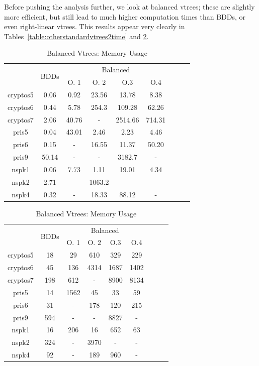 \documentclass[11pt]{report}
\begin{document}
Before pushing the analysis further, we look at balanced vtrees; these are slightly more efficient, but still lead to much higher computation times than BDDs, or even right-linear vtrees. This results appear very clearly in Tables~\ref{table:otherstandardvtrees2time} and \ref{table:otherstandardvtrees2memory}.
\label{balanced_comparisons}
\begin{table}
\centering
\begin{tabular}{|*{9}{c|}}
\hline
 & \multirow{2}{*}{BDDs} & \multicolumn{4}{c|}{Balanced} \\ \cline{3-6}
 & & O. 1& O. 2 & O.3 & O.4 \\ \hline
cryptos5 & 0.06& 0.92 & 23.56 & 13.78 & 8.38\\ \hline
cryptos6 & 0.44 & 5.78 & 254.3& 109.28 & 62.26\\ \hline
cryptos7 & 2.06& 40.76 & - & 2514.66 & 714.31 \\ \hline
pris5 & 0.04 & 43.01 & 2.46& 2.23 & 4.46 \\ \hline
pris6 & 0.15 & - & 16.55 & 11.37 & 50.20 \\ \hline
pris9 & 50.14 & - & - & 3182.7& - \\ \hline
nspk1 &0.06 & 7.73 & 1.11 & 19.01 & 4.34 \\ \hline
nspk2 &2.71 & - & 1063.2 &- & - \\ \hline
nspk4 & 0.32& - & 18.33 & 88.12& -\\ \hline
\end{tabular}
\caption{Balanced Vtrees: Computation Time}
\label{table:otherstandardvtrees2time}
\vspace{1in}
\centering
\begin{tabular}{|*{9}{c|}}
\hline
 & \multirow{2}{*}{BDDs} & \multicolumn{4}{c|}{Balanced} \\ \cline{3-6}
 & & O. 1& O. 2 & O.3 & O.4 \\ \hline
cryptos5 & 18 & 29 & 610 & 329 & 229 \\ \hline
cryptos6 & 45 & 136 & 4314 & 1687 & 1402\\ \hline
cryptos7 & 198& 612 & - & 8900 & 8134 \\ \hline
pris5 & 14 & 1562 & 45 & 33& 59 \\\hline
pris6 &31 & - & 178 & 120& 215 \\ \hline
pris9 &594 & - & - & 8827& -\\ \hline
nspk1 & 16 & 206 & 16 & 652& 63 \\ \hline
nspk2 &324 & - & 3970 & - &- \\ \hline
nspk4 &92 & - & 189 & 960& - \\ \hline
\end{tabular}
\caption{Balanced Vtrees: Memory Usage}
\label{table:otherstandardvtrees2memory}
\end{table}
\end{document}
